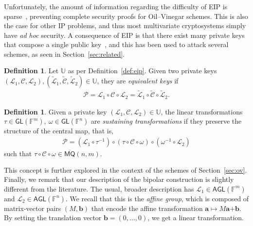 \documentclass[12pt, a4paper, oneside]{memoir}
\theoremstyle{definition}
\newtheorem{definition}[theorem]{Definition}
\begin{document}
Unfortunately, the amount of information regarding the difficulty of EIP is sparse~\cite[p.~69]{Thomae:201306}, preventing complete security proofs for Oil--Vinegar schemes. This is also the case for other IP problems, and thus most multivariate cryptosystems simply have \emph{ad hoc} security. A consequence of EIP is that there exist many private keys that compose a single public key~\cite{Wolf:201104}, and this has been used to attack several schemes, as seen in Section~\ref{sec:related}.

\begin{definition}
  Let $\mathbb{U}$ as per Definition~\ref{def:eip}. Given two private keys $(\mathcal{L}_{1}, \mathcal{C}, \mathcal{L}_{2}), (\widetilde{\mathcal{L}}_{1}, \widetilde{\mathcal{C}}, \widetilde{\mathcal{L}}_{2}) \in \mathbb{U}$, they are \emph{equivalent keys} if
  \begin{align}
    \mathcal{P} = \mathcal{L}_{1} \circ \mathcal{C} \circ \mathcal{L}_{2}
      = \widetilde{\mathcal{L}}_{1} \circ \widetilde{\mathcal{C}} \circ \widetilde{\mathcal{L}}_{2}.
  \end{align}
\end{definition}

\begin{definition}\label{def:sustainer}
  Given a private key $(\mathcal{L}_{1}, \mathcal{C}, \mathcal{L}_{2}) \in \mathbb{U}$, the linear transformations $\tau \in \mathsf{GL}(\mathbb{F}^{m}),\: \omega \in \mathsf{GL}(\mathbb{F}^{n})$ are \emph{sustaining transformations} if they preserve the structure of the central map, that is,
  \begin{align}
    \mathcal{P} = (\mathcal{L}_{1} \circ \tau^{-1}) \circ (\tau \circ \mathcal{C} \circ \omega) \circ (\omega^{-1} \circ \mathcal{L}_{2})
  \end{align}
  such that $\tau \circ \mathcal{C} \circ \omega \in \overline{\mathsf{MQ}}(n, m)$.
\end{definition}

This concept is further explored in the context of the schemes of Section~\ref{sec:ov}. Finally, we remark that our description of the bipolar construction is slightly different from the literature. The usual, broader description has $\mathcal{L}_{1} \in \mathsf{AGL}(\mathbb{F}^{m})$ and $\mathcal{L}_{2} \in \mathsf{AGL}(\mathbb{F}^{n})$. We recall that this is the \emph{affine group}, which is composed of matrix-vector pairs $(M, \mathbf{b})$ that encode the affine transformation $\mathbf{a} \mapsto M\mathbf{a} \bm{+} \mathbf{b}$. By setting the translation vector $\mathbf{b} = (0, \dots, 0)$, we get a linear transformation. 
\end{document}
